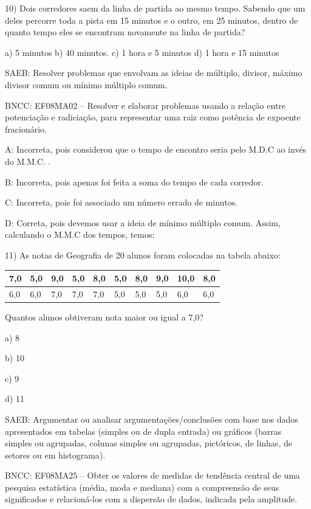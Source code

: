 10) Dois corredores saem da linha de partida ao mesmo tempo. Sabendo que
um deles percorre toda a pista em 15 minutos e o outro, em 25 minutos,
dentro de quanto tempo eles se encontram novamente na linha de partida?

a) 5 minutos b) 40 minutos. c) 1 hora e 5 minutos d) 1 hora e 15 minutos

SAEB: Resolver problemas que envolvam as ideias de múltiplo, divisor,
máximo divisor comum ou mínimo múltiplo comum.

BNCC: EF08MA02 -- Resolver e elaborar problemas usando a relação entre
potenciação e radiciação, para representar uma raiz como potência de
expoente fracionário.

A: Incorreta, pois considerou que o tempo de encontro seria pelo M.D.C
ao invés do M.M.C. .

B: Incorreta, pois apenas foi feita a soma do tempo de cada corredor.

C: Incorreta, pois foi associado um número errado de minutos.

D: Correta, pois devemos usar a ideia de mínimo múltiplo comum. Assim,
calculando o M.M.C dos tempos, temos:

11) As notas de Geografia de 20 alunos foram colocadas na tabela abaixo:


\begin{longtable}[]{@{}llllllllll@{}}
\toprule
7,0 & 5,0 & 9,0 & 5,0 & 8,0 & 5,0 & 8,0 & 9,0 & 10,0 &
8,0\tabularnewline
\midrule
\endhead
6,0 & 6,0 & 7,0 & 7,0 & 7,0 & 5,0 & 5,0 & 5,0 & 6,0 & 6,0\tabularnewline
\bottomrule
\end{longtable}

Quantos alunos obtiveram nota maior ou igual a 7,0?

a) 8

b) 10

c) 9

d) 11

SAEB: Argumentar ou analisar argumentações/conclusões com base nos dados
apresentados em tabelas (simples ou de dupla entrada) ou gráficos
(barras simples ou agrupadas, colunas simples ou agrupadas, pictóricos,
de linhas, de setores ou em histograma).

BNCC: EF08MA25 -- Obter os valores de medidas de tendência central de
uma pesquisa estatística (média, moda e mediana) com a compreensão de
seus significados e relacioná-los com a dispersão de dados, indicada
pela amplitude.

